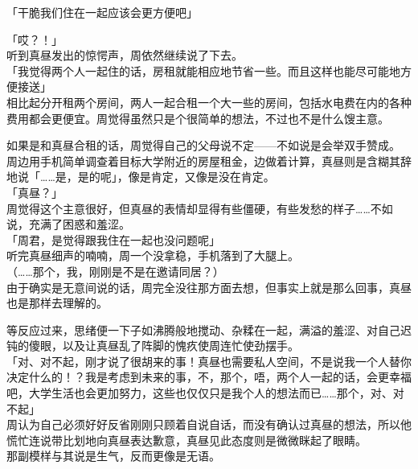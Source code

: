「干脆我们住在一起应该会更方便吧」

「哎？！」\\

听到真昼发出的惊愕声，周依然继续说了下去。\\

「我觉得两个人一起住的话，房租就能相应地节省一些。而且这样也能尽可能地方便接送」\\

相比起分开租两个房间，两人一起合租一个大一些的房间，包括水电费在内的各种费用都会更便宜。周觉得虽然只是个很简单的想法，不过也不是什么馊主意。

如果是和真昼合租的话，周觉得自己的父母说不定——不如说是会举双手赞成。\\

周边用手机简单调查着目标大学附近的房屋租金，边做着计算，真昼则是含糊其辞地说「……是，是的呢」，像是肯定，又像是没在肯定。\\

「真昼？」\\

周觉得这个主意很好，但真昼的表情却显得有些僵硬，有些发愁的样子……不如说，充满了困惑和羞涩。\\

「周君，是觉得跟我住在一起也没问题呢」\\

听完真昼细声的喃喃，周一个没拿稳，手机落到了大腿上。\\

（……那个，我，刚刚是不是在邀请同居？）\\

由于确实是无意间说的话，周完全没往那方面去想，但事实上就是那么回事，真昼也是那样去理解的。

等反应过来，思绪便一下子如沸腾般地搅动、杂糅在一起，满溢的羞涩、对自己迟钝的傻眼，以及让真昼乱了阵脚的愧疚使周连忙使劲摆手。\\

「对、对不起，刚才说了很胡来的事！真昼也需要私人空间，不是说我一个人替你决定什么的！？我是考虑到未来的事，不，那个，唔，两个人一起的话，会更幸福吧，大学生活也会更加努力，这些也仅仅只是我个人的想法而已……那个，对、对不起」\\

周认为自己必须好好反省刚刚只顾着自说自话，而没有确认过真昼的想法，所以他慌忙连说带比划地向真昼表达歉意，真昼见此态度则是微微眯起了眼睛。\\

那副模样与其说是生气，反而更像是无语。\\


